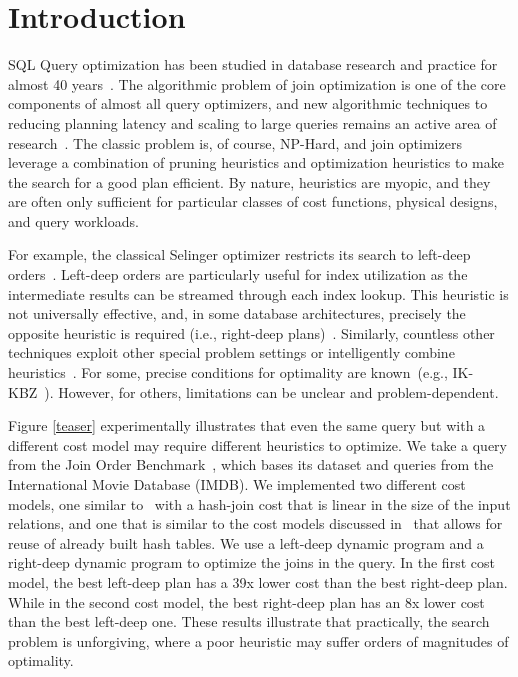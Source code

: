 \section{Introduction}\label{intro}\sloppy
SQL Query optimization has been studied in database research and practice for almost 40 years~\cite{selinger1979access}.
The algorithmic problem of join optimization is one of the core components of almost all query optimizers, and new algorithmic techniques to reducing planning latency and scaling to large queries remains an active area of research~\cite{trummer2017solving,neumann2018adaptive}.
The classic problem is, of course, NP-Hard, and 
join optimizers leverage a combination of pruning heuristics and optimization heuristics to make the search for a good plan efficient.
By nature, heuristics are myopic, and they are often only sufficient for particular classes of cost functions, physical designs, and query workloads.

For example, the classical Selinger optimizer restricts its search to left-deep orders~\cite{selinger1979access}.
Left-deep orders are particularly useful for index utilization as the intermediate results can be streamed through each index lookup. 
This heuristic is not universally effective, and, in some database architectures, precisely the opposite heuristic is required (i.e., right-deep plans)~\cite{gerber1986data}.
Similarly, countless other techniques exploit other special problem settings or intelligently combine heuristics~\cite{swami1993polynomial,steinbrunn1997heuristic,galindo2008optimizing,ziane1993parallel}. 
For some, precise conditions for optimality are known~(e.g., IK-KBZ~\cite{krishnamurthy1986optimization}). However, for others, limitations can be unclear and problem-dependent. 

Figure \ref{teaser} experimentally illustrates
that even the same query but with a different cost model may require different heuristics to optimize.
We take a query from the Join Order Benchmark~\cite{leis2015good}, which bases its dataset and queries from the International Movie Database (IMDB). We implemented two different cost models, one similar to~\cite{leis2015good} with a hash-join cost that is linear in the size of the input relations, and one that is similar to the cost models discussed in~\cite{ziane1993parallel} that allows for reuse of already built hash tables.
We use a left-deep dynamic program and a right-deep dynamic program to optimize the joins in the query.
In the first cost model, the best left-deep plan has a 39x lower cost than the best right-deep plan. While in the second cost model, the best right-deep plan has an 8x lower cost than the best left-deep one.
These results illustrate that practically, the search problem is unforgiving, where a poor heuristic may suffer orders of magnitudes of optimality.

